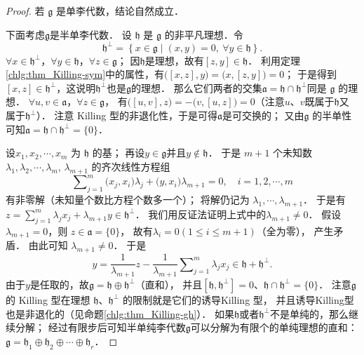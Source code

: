 \begin{proof}
    若 $\mathfrak{g}$ 是单李代数，结论自然成立．
    
    下面考虑$\mathfrak{g}$是半单李代数．
    设 $\mathfrak{h}$ 是 $\mathfrak{g}$ 的非平凡理想．令
    \begin{equation}\label{chlg:eqn_h-perp}
        \mathfrak{h}^{\perp}=\left\{x \in \mathfrak{g} \mid (x, y)=0,\ \forall y \in \mathfrak{h}\right\} .
    \end{equation}
    $\forall x \in \mathfrak{h}^{\perp}$，$\forall y \in \mathfrak{h}$，$\forall z \in \mathfrak{g}$；
    因$\mathfrak{h}$是理想，故有$[z, y]\in \mathfrak{h}$．
    利用定理\ref{chlg:thm_Killing-sym}中的属性，有$\bigl([x, z], y\bigr)=\bigl(x,[z, y]\bigr)=0$；
    于是得到$[x, z]\in \mathfrak{h}^\perp$，这说明$\mathfrak{h}^\perp$也是$\mathfrak{g}$的理想．
    那么它们两者的交集$\mathfrak{a}=\mathfrak{h} \cap \mathfrak{h}^{\perp}$同是 $\mathfrak{g}$ 的理想．
    $\forall u, v \in \mathfrak{a}$，$\forall z \in \mathfrak{g}$，
    有$\bigl([u, v], z\bigr)=-\bigl(v,[u, z]\bigr)=0$（注意$u$、$v$既属于$\mathfrak{h}$又
    属于$\mathfrak{h}^{\perp}$）．
    注意 Killing 型的非退化性，于是可得$\mathfrak{a}$是可交换的；
    又由$\mathfrak{g}$ 的半单性可知$\mathfrak{a}=\mathfrak{h} \cap \mathfrak{h}^{\perp}=\{0\}$．
    
    
    设$x_1, x_2, \cdots, x_m$ 为 $\mathfrak{h}$ 的基；
    再设$y \in \mathfrak{g}$并且$ y \notin \mathfrak{h}$．
    于是 $m+1$ 个未知数 $\lambda_1, \lambda_2, \cdots, \lambda_m$, $\lambda_{m+1}$ 的齐次线性方程组
    \begin{equation}
        \sum\nolimits_{j=1}^m \bigl(x_j, x_i\bigr) \lambda_j+ \bigl(y, x_i\bigr) \lambda_{m+1}=0, \quad i=1,2, \cdots, m
    \end{equation}
    有{\kaishu 非零解}（未知量个数比方程个数多一个）；
    将解仍记为 $\lambda_1, \cdots,  \lambda_{m+1}$．
    于是有$z=\sum_{j=1}^m \lambda_j x_j+\lambda_{m+1} y \in \mathfrak{h}^{\perp} $．
    我们用反证法证明上式中的$\lambda_{m+1} \neq 0$．
    假设$\lambda_{m+1}=0$，则 $z \in \mathfrak{a}=\{0\}$，
    故有$\lambda_i=0 (1 \leqslant i \leqslant m+1)$（全为零）， 产生矛盾．
    由此可知 $\lambda_{m+1} \neq 0$． 于是
    \begin{equation}
        y=\frac{1}{\lambda_{m+1}} z-\frac{1}{\lambda_{m+1}} 
        \sum\nolimits_{j=1}^m \lambda_j x_j \in \mathfrak{h}+\mathfrak{h}^{\perp} .
    \end{equation}
    由于$y$是任取的，故$\mathfrak{g}=\mathfrak{h} \oplus \mathfrak{h}^{\perp}$（直和），
    并且$[\mathfrak{h} , \mathfrak{h}^{\perp}]=0$、$\mathfrak{h} \cap \mathfrak{h}^{\perp}=\{0\}$．
    注意$\mathfrak{g}$ 的 Killing 型在理想 $\mathfrak{h}$、$ \mathfrak{h}^{\perp}$ 的限制就是它们的诱导Killing 型，
    并且诱导Killing型也是非退化的（见命题\ref{chlg:thm_Killing-gh}）． %
    如果$\mathfrak{h}$或者$ \mathfrak{h}^{\perp}$不是单纯的，那么继续分解；
    经过有限步后可知半单纯李代数$\mathfrak{g}$可以分解为有限个的单纯理想的直和：
    $\mathfrak{g}=\mathfrak{h}_1 \oplus \mathfrak{h}_2 \oplus \cdots \oplus \mathfrak{h}_r$．
    

\end{proof}
